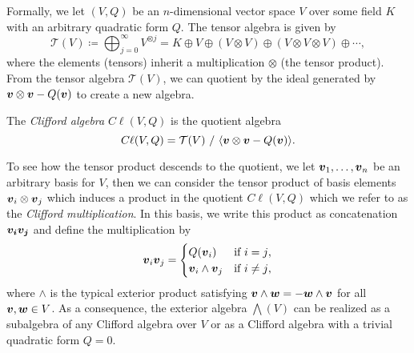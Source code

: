 Formally, we let $(V,Q)$ be an $n$-dimensional vector space $V$ over some field $K$ with an arbitrary quadratic form $Q$.  The tensor algebra is given by
\begin{equation}
\mathcal{T}(V) \coloneqq \bigoplus_{j=0}^\infty V^{\otimes j} = K \oplus V \oplus (V\otimes V) \oplus (V\otimes V \otimes V) \oplus \cdots,
\end{equation}
where the elements (tensors) inherit a multiplication $\otimes$ (the tensor product). From the tensor algebra $\mathcal{T}(V)$, we can quotient by the ideal generated by $\boldsymbol{v}\otimes \boldsymbol{v} - Q(\boldsymbol{v})$ to create a new algebra.
\begin{definition}
The \emph{Clifford algebra} $C\ell(V,Q)$ is the quotient algebra
\begin{equation}
C\ell(V,Q) = \mathcal{T}(V) ~ / ~ \langle \boldsymbol{v} \otimes \boldsymbol{v} - Q(\boldsymbol{v}) \rangle.
\end{equation}
\end{definition}
To see how the tensor product descends to the quotient, we let $\boldsymbol{v}_1, \dots, \boldsymbol{v}_n$ be an arbitrary basis for $V$, then we can consider the tensor product of basis elements $\boldsymbol{v}_i \otimes \boldsymbol{v}_j$ which induces a product in the quotient $C\ell(V,Q)$ which we refer to as the \emph{Clifford multiplication}. In this basis, we write this product as concatenation $\boldsymbol{v_i}\boldsymbol{v_j}$ and define the multiplication by
\begin{equation}
\label{eq:clifford_multiplication}
\boldsymbol{v}_i \boldsymbol{v}_j = \begin{cases} Q(\boldsymbol{v}_i) & \textrm{if $i=j$}, \\ \boldsymbol{v}_i \wedge \boldsymbol{v}_j & \textrm{if $i\neq j$},\end{cases}
\end{equation}
where $\wedge$ is the typical exterior product satisfying $\boldsymbol{v}\wedge \boldsymbol{w} = - \boldsymbol{w}\wedge \boldsymbol{v}$ for all $\boldsymbol{v},\boldsymbol{w}\in V$.  As a consequence, the exterior algebra $\bigwedge(V)$ can be realized as a subalgebra of any Clifford algebra over $V$ or as a Clifford algebra with a trivial quadratic form $Q=0$.  

